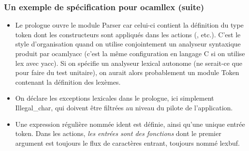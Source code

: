 %
\begin{frame}
\frametitle{Un exemple de spécification pour ocamllex (suite)}

\begin{itemize}

  \item Le prologue ouvre le module \textsf{Parser} car celui-ci
  contient la définition du type \textsf{token} dont les constructeurs
  sont appliqués dans les actions (, 
  etc.). C'est le style d'organisation quand on utilise conjointement
  un analyseur syntaxique produit par \textsf{ocamlyacc} (c'est la
  même configuration en langage C si on utilise \textsf{lex} avec
  \textsf{yacc}). Si on spécifie un analyseur lexical autonome (ne
  serait-ce que pour faire du test unitaire), on aurait alors
  probablement un module \textsf{Token} contenant la définition des
  lexèmes.

  \item On déclare les exceptions lexicales dans le prologue, ici
  simplement \textsf{Illegal\_char}, qui doivent être filtrées au
  niveau du pilote de l'application.

  \item Une expression régulière nommée \textsf{ident} est définie,
  ainsi qu'une unique entrée \textsf{token}. Dans les actions,
  \emph{les entrées sont des fonctions} dont le premier argument est
  toujours le flux de caractères entrant, toujours nommé
  \textsf{lexbuf}.

\end{itemize}

\end{frame}

